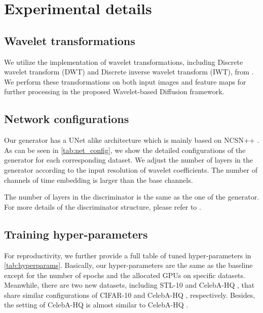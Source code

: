 \documentclass[10pt,twocolumn,letterpaper]{article}
\newcommand{\minisection}[1]{\vspace{2mm}\noindent{\textbf{#1}}}
\begin{document}
\section{Experimental details} \label{apsec:exp_details}



\subsection{Wavelet transformations} We utilize the implementation of wavelet transformations, including Discrete wavelet transform (DWT) and Discrete inverse wavelet transform (IWT), from \cite{li2020wavelet}. We perform these transformations on both input images and feature maps for further processing in the proposed Wavelet-based Diffusion framework.








\subsection{Network configurations}
\minisection{Generator.} Our generator has a UNet alike architecture\cite{ronneberger2015u} which is mainly based on NCSN++ \cite{song2020score,xiao2021tackling}. As can be seen in \cref{tab:net_config}, we show the detailed configurations of the generator for each corresponding dataset. We adjust the number of layers in the generator according to the input resolution of wavelet coefficients. The number of channels of time embedding is  larger than the base channels.

\minisection{Discriminator.} The number of layers in the discriminator is the same as the one of the generator. For more details of the discriminator structure, please refer to \cite{xiao2021tackling}.





\subsection{Training hyper-parameters}
For reproductivity, we further provide a full table of tuned hyper-parameters in \cref{tab:hyperparams}. Basically, our hyper-parameters are the same as the baseline \cite{xiao2021tackling} except for the number of epochs and the allocated GPUs on specific datasets. Meanwhile, there are two new datasets, including STL-10  and CelebA-HQ , that share similar configurations of CIFAR-10 and CelebA-HQ , respectively. Besides, the setting of CelebA-HQ  is almost similar to CelebA-HQ . 
\end{document}
